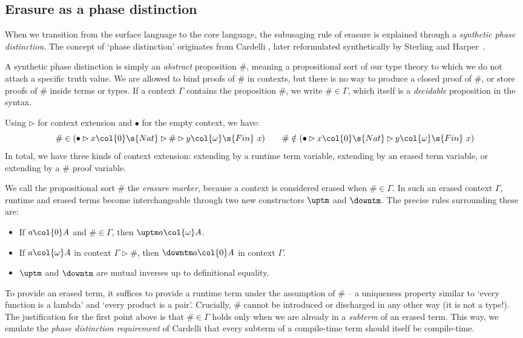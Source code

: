 \subsection{Erasure as a phase distinction}\label{sub:phase}


When we transition from the surface language to the core language, the
subusaging rule of erasure is explained through a \emph{synthetic phase
distinction}. The concept of `phase distinction' originates from Cardelli
\cite{Cardelli1988-zp}, later reformulated synthetically by Sterling and
Harper~\cite{Sterling2021-pm}.

A synthetic phase distinction is simply an \emph{abstract} proposition $\#$,
meaning a propositional sort of our type theory to which we do not attach a
specific truth value. We are allowed to bind proofs of $\#$ in contexts, but
there is no way to produce a closed proof of $\#$, or store proofs of $\#$
inside terms or types. If a context $\Gamma$ contains the proposition $\#$, we
write $\# \in \Gamma$, which itself is a \emph{decidable} proposition in the
syntax.

\begin{example}
Using $\rhd$ for context extension and $\bullet$
for the empty context, we have:
$$
\# \in (\bullet \rhd x \col{0} \s{Nat} \rhd \# \rhd y \col{\omega} \s{Fin}\ x) \qquad
\# \notin (\bullet \rhd x \col{0} \s{Nat} \rhd y \col{\omega} \s{Fin}\ x) 
$$
In total, we have three kinds of context extension:
extending by a runtime term variable, extending by an erased term variable, or extending
by a $\#$ proof variable.
\end{example}

We call the propositional sort $\#$ the \emph{erasure marker}, because a context
is considered erased when $\# \in \Gamma$. In such an erased context $\Gamma$,
runtime and erased terms become interchangeable through two new constructors
$\uptm$ and $\downtm$. The precise rules surrounding these are:
\begin{itemize}
    \item \label{item:marker-1} If $a \col{0} A$ and $\# \in \Gamma$,
      then ${\uptm a} \col{\omega} A$.
    \item \label{item:marker-2} If $a \col{\omega} A$ in context $\Gamma \rhd \#$, then ${\downtm a}
      \col{0} A$ in context $\Gamma$.
    \item \label{item:marker-3} $\uptm$ and $\downtm$ are mutual inverses up to definitional equality.
\end{itemize}
To provide an erased term, it suffices to provide a runtime term under the
assumption of $\#$ -- a uniqueness property similar to `every function is a
lambda' and `every product is a pair'. Crucially, $\#$ cannot be introduced or
discharged in any other way (it is not a type!). The justification for the first point above is that
$\# \in \Gamma$ holds only when we are already in a \emph{subterm} of an erased
term. This way, we emulate the \emph{phase distinction requirement} of Cardelli
that every subterm of a compile-time term should itself be compile-time.

